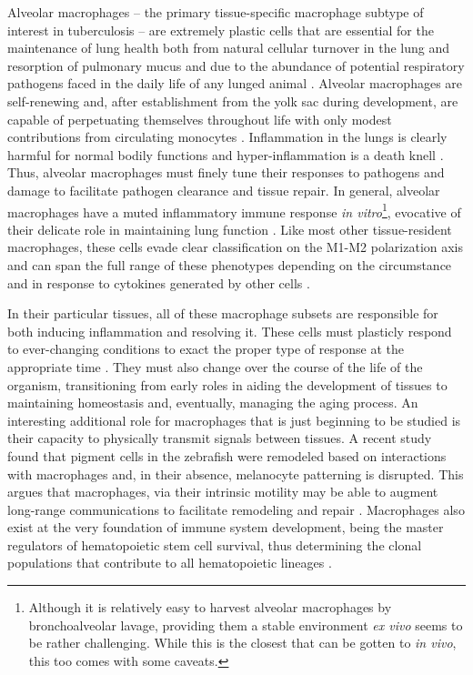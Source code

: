 Alveolar macrophages -- the primary tissue\hyp{}specific macrophage subtype of interest in tuberculosis -- are extremely plastic cells that are essential for the maintenance of lung health both from natural cellular turnover in the lung and resorption of pulmonary mucus and due to the abundance of potential respiratory pathogens faced in the daily life of any lunged animal \citep{Hussell2014}. Alveolar macrophages are self\hyp{}renewing and, after establishment from the yolk sac during development, are capable of perpetuating themselves throughout life with only modest contributions from circulating monocytes \citep{Hashimoto2013, Yona2013, Varol2015}. Inflammation in the lungs is clearly harmful for normal bodily functions and hyper\hyp{}inflammation is a death knell \citep{Kemp2002}. Thus, alveolar macrophages must finely tune their responses to pathogens and damage to facilitate pathogen clearance and tissue repair. In general, alveolar macrophages have a muted inflammatory immune response \textit{in vitro}\footnote{Although it is relatively easy to harvest alveolar macrophages by bronchoalveolar lavage, providing them a stable environment \textit{ex vivo} seems to be rather challenging. While this is the closest that can be gotten to \textit{in vivo}, this too comes with some caveats.}, evocative of their delicate role in maintaining lung function \citep{Svedberg2019, Joshi2018}. Like most other tissue\hyp{}resident macrophages, these cells evade clear classification on the M1\hyp{}M2 polarization axis and can span the full range of these phenotypes depending on the circumstance and in response to cytokines generated by other cells \citep{Svedberg2019, Hussell2014}. 

In their particular tissues, all of these macrophage subsets are responsible for both inducing inflammation and resolving it. These cells must plasticly respond to ever\hyp{}changing conditions to exact the proper type of response at the appropriate time \citep{Pollard2009}. They must also change over the course of the life of the organism, transitioning from early roles in aiding the development of tissues to maintaining homeostasis and, eventually, managing the aging process. An interesting additional role for macrophages that is just beginning to be studied is their capacity to physically transmit signals between tissues. A recent study found that pigment cells in the zebrafish were remodeled based on interactions with macrophages and, in their absence, melanocyte patterning is disrupted. This argues that macrophages, via their intrinsic motility may be able to augment long\hyp{}range communications to facilitate remodeling and repair \citep{Eom2017}. Macrophages also exist at the very foundation of immune system development, being the master regulators of hematopoietic stem cell survival, thus determining the clonal populations that contribute to all hematopoietic lineages \citep{Wattrus2022}.

